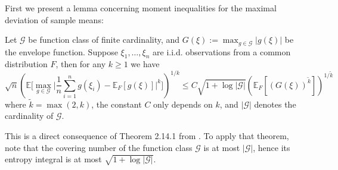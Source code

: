 \documentclass[mnsc,blindrev]{informs4} %
\newcommand{\prth}[1]{\left(#1\right)}
\begin{document}
First we present a lemma concerning moment inequalities for the maximal deviation of sample means:
\begin{lemma}\label{maximal deviation:empirical process of finite cardinality}
Let $\mathcal G$ be function class of finite cardinality, and $G(\xi):=\max_{g\in\mathcal G}\lvert g(\xi)\rvert$ be the envelope function. Suppose $\xi_1,\ldots,\xi_n$ are i.i.d. observations from a common distribution $F$, then for any $k\geq 1$ we have
\begin{equation*}
    \sqrt{n}\prth{\mathbb E\big[\max_{g\in\mathcal G}\big\lvert\frac{1}{n}\sum_{i=1}^ng(\xi_i)-\mathbb E_F[g(\xi)]\big\rvert^k\big]}^{1/k}\leq C\sqrt{1+\log\lvert \mathcal G\rvert}\prth{\mathbb E_F[(G(\xi))^{\tilde k}]}^{1/\tilde k}
\end{equation*}
where $\tilde k=\max(2,k)$, the constant $C$ only depends on $k$, and $\lvert \mathcal G\rvert$ denotes the cardinality of $\mathcal G$.
\end{lemma}
This is a direct consequence of Theorem 2.14.1 from \cite{van1996weak}. To apply that theorem, note that the covering number of the function class $\mathcal G$ is at most $\lvert \mathcal G\rvert$, hence its entropy integral is at most $\sqrt{1+\log\lvert \mathcal G\rvert}$.\hfill\Halmos
\end{document}
